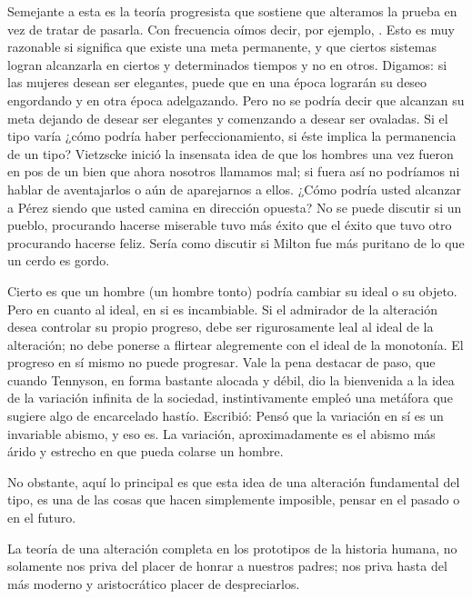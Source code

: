 Semejante a esta es la teoría progresista que sostiene que alteramos la prueba en vez de tratar de
pasarla. Con frecuencia oímos decir, por ejemplo, . Esto es
muy razonable si significa que existe una meta permanente, y que ciertos sistemas logran alcanzarla en
ciertos y determinados tiempos y no en otros. Digamos: si las mujeres desean ser elegantes, puede que en
una época lograrán su deseo engordando y en otra época adelgazando. Pero no se podría decir que
alcanzan su meta dejando de desear ser elegantes y comenzando a desear ser ovaladas. Si el tipo varía
¿cómo podría haber perfeccionamiento, si éste implica la permanencia de un tipo? Vietzscke inició la
insensata idea de que los hombres una vez fueron en pos de un bien que ahora nosotros llamamos mal; si
fuera así no podríamos ni hablar de aventajarlos o aún de aparejarnos a ellos. ¿Cómo podría usted
alcanzar a Pérez siendo que usted camina en dirección opuesta? No se puede discutir si un pueblo,
procurando hacerse miserable tuvo más éxito que el éxito que tuvo otro procurando hacerse feliz. Sería
como discutir si Milton fue más puritano de lo que un cerdo es gordo.

Cierto es que un hombre (un hombre tonto) podría cambiar su ideal o su objeto. Pero en cuanto al
ideal, en si es incambiable. Si el admirador de la alteración desea controlar su propio progreso, debe ser
rigurosamente leal al ideal de la alteración; no debe ponerse a flirtear alegremente con el ideal de la
monotonía. El progreso en sí mismo no puede progresar. Vale la pena destacar de paso, que cuando
Tennyson, en forma bastante alocada y débil, dio la bienvenida a la idea de la variación infinita de la
sociedad, instintivamente empleó una metáfora que sugiere algo de encarcelado hastío. Escribió:
Pensó que la variación en sí es un invariable abismo, y eso es. La variación, aproximadamente es el
abismo más árido y estrecho en que pueda colarse un hombre.

No obstante, aquí lo principal es que esta idea de una alteración fundamental del tipo, es una de las
cosas que hacen simplemente imposible, pensar en el pasado o en el futuro.

La teoría de una alteración completa en los prototipos de la historia humana, no solamente nos priva
del placer de honrar a nuestros padres; nos priva hasta del más moderno y aristocrático placer de
despreciarlos.

